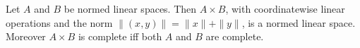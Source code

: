 Let $A$ and $B$ be normed linear spaces. Then $A \times B$, with coordinatewise linear operations and the norm $\|(x, y)\| = \|x\| + \|y\|$, is a normed linear space. Moreover $A \times B$ is complete iff both $A$ and $B$ are complete.
